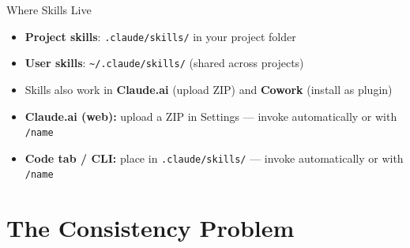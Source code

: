 \documentclass[aspectratio=169]{beamer}
\begin{document}
\begin{frame}{Where Skills Live}
\begin{itemize}
  \item \textbf{Project skills}: \texttt{.claude/skills/} in your project folder
  \item \textbf{User skills}: \texttt{\textasciitilde/.claude/skills/} (shared across projects)
  \item Skills also work in \textbf{Claude.ai} (upload ZIP) and \textbf{Cowork} (install as plugin)
\end{itemize}
\vspace{0.3cm}
\begin{itemize}
  \item \textbf{Claude.ai (web):} upload a ZIP in Settings --- invoke automatically or with \texttt{/name}
  \item \textbf{Code tab / CLI:} place in \texttt{.claude/skills/} --- invoke automatically or with \texttt{/name}
\end{itemize}
\end{frame}

\section{The Consistency Problem}
\end{document}
